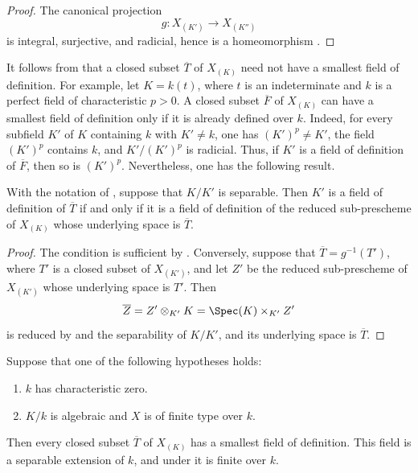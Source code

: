 \begin{proof}
The canonical projection
\[
g:X_{(K')}\longrightarrow X_{(K'')}
\]
is integral, surjective, and radicial, hence is a homeomorphism
.
\end{proof}

\begin{remark}[4.9.3]
\label{IV.4.9.3}
It follows from  that a closed subset
$\overline T$ of $X_{(K)}$ need not have a smallest field of
definition.
For example, let $K=k(t)$, where $t$ is an indeterminate and $k$ is
a perfect field of characteristic $p>0$.
A closed subset $\overline F$ of $X_{(K)}$ can have a smallest field
of definition only if it is already defined over $k$.
Indeed, for every subfield $K'$ of $K$ containing $k$ with
$K'\ne k$, one has $(K')^p\ne K'$, the field $(K')^p$ contains $k$,
and $K'/(K')^p$ is radicial.
Thus, if $K'$ is a field of definition of $\overline F$, then so is
$(K')^p$.
Nevertheless, one has the following result.
\end{remark}


\begin{proposition}[4.9.4]
\label{IV.4.9.4}
With the notation of , suppose that $K/K'$ is
separable.
Then $K'$ is a field of definition of $\overline T$ if and only if
it is a field of definition of the reduced sub-prescheme of
$X_{(K)}$ whose underlying space is $\overline T$.
\end{proposition}

\begin{proof}
The condition is sufficient by .
Conversely, suppose that
$\overline T=g^{-1}(T')$, where $T'$ is a closed subset of
$X_{(K')}$, and let $Z'$ be the reduced sub-prescheme of $X_{(K')}$
whose underlying space is $T'$.
Then
\[
\overline Z=Z'\otimes_{K'}K=\Spec(K)\times_{K'}Z'
\]
is reduced by  and the separability of $K/K'$,
and its underlying space is $\overline T$.
\end{proof}

\begin{corollary}[4.9.5]
\label{IV.4.9.5}
Suppose that one of the following hypotheses holds:
\begin{enumerate}
\item[\rm(a)]
\label{IV.4.9.5.a}
$k$ has characteristic zero.
\item[\rm(b)]
\label{IV.4.9.5.b}
$K/k$ is algebraic and $X$ is of finite type over $k$.
\end{enumerate}
Then every closed subset $\overline T$ of $X_{(K)}$ has a smallest
field of definition.
This field is a separable extension of $k$, and under
 it is finite over $k$.
\end{corollary}

